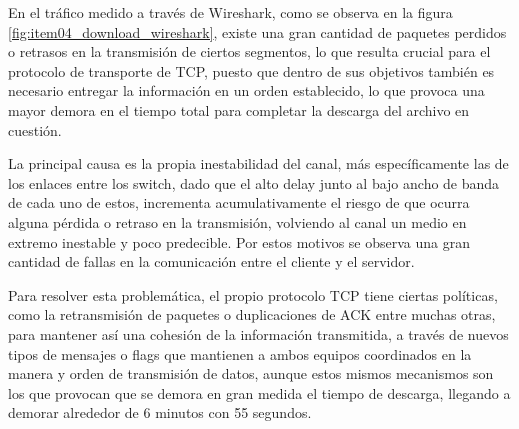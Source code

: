 \documentclass[10pt]{article}
\begin{document}
\begin{tcolorbox}[enhanced,frame style image=blueshade.png,
  opacityback=0.75,opacitybacktitle=0.25,
  colback=blue!5!white,colframe=blue!75!black,
  title=¿Qué problemas se puede observar en la transmisión TCP de paquetes? ¿Por qué se producen? ¿Cómo resuelve TCP este problema?]
  
  
  En el tráfico medido a través de Wireshark, como se observa en la figura \ref{fig:item04_download_wireshark}, existe una gran cantidad de paquetes perdidos o retrasos en la transmisión de ciertos segmentos, lo que resulta crucial para el protocolo de transporte de TCP, puesto que dentro de sus objetivos también es necesario entregar la información en un orden establecido, lo que provoca una mayor demora en el tiempo total para completar la descarga del archivo en cuestión.\newline
  
  \noindent
  La principal causa es la propia inestabilidad del canal, más específicamente las de los enlaces entre los switch, dado que el alto delay junto al bajo ancho de banda de cada uno de estos, incrementa acumulativamente el riesgo de que ocurra alguna pérdida o retraso en la transmisión, volviendo al canal un medio en extremo inestable y poco predecible. Por estos motivos se observa una gran cantidad de fallas en la comunicación entre el cliente y el servidor. \newline
  
  \noindent
  Para resolver esta problemática, el propio protocolo TCP tiene ciertas políticas, como la retransmisión de paquetes o duplicaciones de ACK entre muchas otras, para mantener así una cohesión de la información transmitida, a través de nuevos tipos de mensajes o flags que mantienen a ambos equipos coordinados en la manera y orden de transmisión de datos, aunque estos mismos mecanismos son los que provocan que se demora en gran medida el tiempo de descarga, llegando a demorar alrededor de 6 minutos con 55 segundos. 
  
  
  

\end{tcolorbox}
\end{document}

